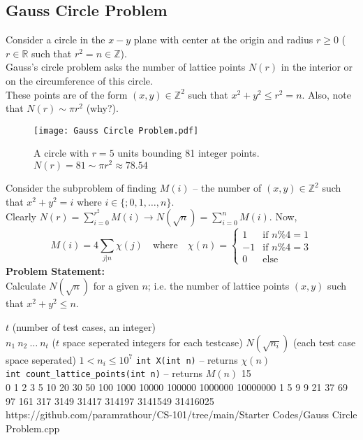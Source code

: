 \documentclass[../../Problems]{subfiles}
\begin{document}
\subsection{Gauss Circle Problem}\label{pp:gausscircle}
Consider a circle in the $x-y$ plane with center at the origin and radius $r\geq 0$ ($r\in\mathbb{R}$ such that $r^2=n\in\mathbb{Z}$).\\
Gauss's circle problem asks the number of lattice points $N(r)$ in the interior or on the circumference of this circle.\\
These points are of the form $(x,y) \in \mathbb{Z}^2$ such that $x^2+y^2\leq r^2=n$. Also, note that $N(r)\sim\pi r^2$ (why?).
\begin{figure}[H]
\centering
\texttt{[image: Gauss Circle Problem.pdf]}
\caption{A circle with $r=5$ units bounding 81 integer points. $N(r) = 81 \sim\pi r^2\approx78.54$}
\end{figure}
\vspace*{-1em}
Consider the subproblem of finding $M(i)$ -- the number of $(x,y) \in \mathbb{Z}^2$ such that $x^2+y^2=i$ where $i\in\{;0,1,\ldots,n\}.$ %
\\Clearly $\displaystyle N(r)=\sum_{i=0}^{r^2} M(i) \rightarrow N(\sqrt{n})=\sum_{i=0}^{n} M(i)$. Now,\vspace*{-1em}
\begin{equation}
	M(i) = 4\sum_{j|n}\chi(j)\quad\text{where}\quad\chi(n)=\begin{cases} 
      1 & \text{if $n\%4=1$}\\
      -1 & \text{if $n\%4=3$}\\
      0 & \text{else}
   \end{cases}
\end{equation}
\textbf{Problem Statement:}\\
Calculate $N(\sqrt{n})$ for a given $n$; i.e. the number of lattice points $(x,y)$ such that $x^2+y^2\leq n$.
\begin{testcasesFunction}
	{$t$ \hfill(number of test cases, an integer)\\
	$n_1\ n_2\ \ldots\ n_t$ \hfill($t$ space seperated integers for each testcase)}
	{$N(\sqrt{n_i})$ \hfill(each test case space seperated)}
	{$1 < n_i \leq 10^{7}$}
	{\texttt{int X(int n)} -- returns $\chi(n)$\\
	\texttt{int count\_lattice\_points(int n)} -- returns $M(n)$}
	{15\\0 1 2 3 5 10 20 30 50 100 1000 10000 100000 1000000 10000000}
	{1 5 9 9 21 37 69 97 161 317 3149 31417 314197 3141549 31416025}
	{https://github.com/paramrathour/CS-101/tree/main/Starter Codes/Gauss Circle Problem.cpp}
\end{testcasesFunction}
\end{document}
